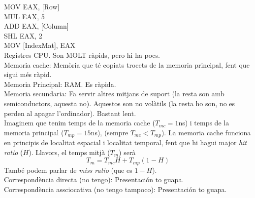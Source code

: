 MOV EAX, [Row]\\
MUL EAX, 5\\
ADD EAX, [Column]\\
SHL EAX, 2\\
MOV [IndexMat], EAX\\

Registres CPU. Son MOLT ràpids, pero hi ha pocs.\\
Memoria cache: Memòria que té copiats trocets de la memoria principal, fent que sigui més ràpid.\\
Memoria Principal: RAM. Es ràpida.\\
Memoria secundaria: Fa servir altres mitjans de suport (la resta son amb semiconductors, aquesta no). Aquestos son no volàtils (la resta ho son, no es perden al apagar l'ordinador). Bastant lent.\\
Imaginem que tenim temps de la memoria cache ($T_{mc} = 1$ns) i temps de la memoria principal ($T_{mp} = 15$ns), (sempre $T_{mc} < T_{mp}$). La memoria cache funciona en principis de localitat espacial i localitat temporal, fent que hi hagui major \textit{hit ratio} ($H$). Llavors, el temps mitjà ($T_m$) serà
\begin{displaymath}
    T_m = T_{mc}H + T_{mp}(1-H)
\end{displaymath}
També podem parlar de \textit{miss ratio} (que es $1-H$).\\
Correspondència directa (no tengo): Presentación to guapa.\\
Correspondència assciocativa (no tengo tampoco): Presentación to guapa.